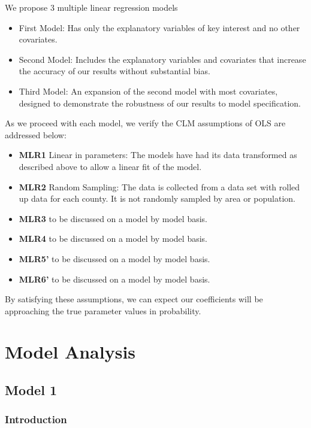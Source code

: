 \documentclass[]{article}
\begin{document}
We propose 3 multiple linear regression models

\begin{itemize}
\item
  First Model: Has only the explanatory variables of key interest and no
  other covariates.
\item
  Second Model: Includes the explanatory variables and covariates that
  increase the accuracy of our results without substantial bias.
\item
  Third Model: An expansion of the second model with most covariates,
  designed to demonstrate the robustness of our results to model
  specification.
\end{itemize}

As we proceed with each model, we verify the CLM assumptions of OLS are
addressed below:

\begin{itemize}
\item
  \textbf{MLR1} Linear in parameters: The models have had its data
  transformed as described above to allow a linear fit of the model.
\item
  \textbf{MLR2} Random Sampling: The data is collected from a data set
  with rolled up data for each county. It is not randomly sampled by
  area or population.
\item
  \textbf{MLR3} to be discussed on a model by model basis.
\item
  \textbf{MLR4} to be discussed on a model by model basis.
\item
  \textbf{MLR5'} to be discussed on a model by model basis.
\item
  \textbf{MLR6'} to be discussed on a model by model basis.
\end{itemize}

By satisfying these assumptions, we can expect our coefficients will be
approaching the true parameter values in probability.

\hypertarget{model-analysis}{%
\section{Model Analysis}\label{model-analysis}}

\hypertarget{model-1}{%
\subsection{Model 1}\label{model-1}}

\hypertarget{introduction-1}{%
\subsubsection{Introduction}\label{introduction-1}}
\end{document}
